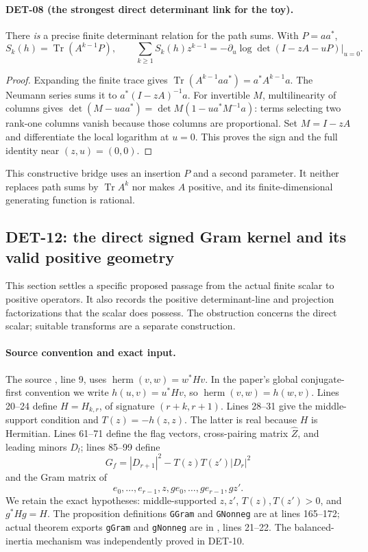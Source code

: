 \documentclass[11pt,a4paper]{article}
\newcommand{\Tr}{\operatorname{Tr}}
\newcommand{\fid}[1]{\textsf{#1}}
\begin{document}
\paragraph{DET-08 (the strongest direct determinant link for the toy).}
There \emph{is} a precise finite determinant relation for the path sums. With $P=aa^*$,
\[
 S_k(h)=\Tr(A^{k-1}P),\qquad
 \sum_{k\ge1}S_k(h)z^{k-1}
 =-\left.\partial_u\log\det(I-zA-uP)\right|_{u=0}.
\]
\begin{proof}
Expanding the finite trace gives $\Tr(A^{k-1}aa^*)=a^*A^{k-1}a$. The Neumann series sums it to $a^*(I-zA)^{-1}a$. For invertible $M$, multilinearity of columns gives
$\det(M-uaa^*)=\det M(1-u a^*M^{-1}a)$: terms selecting two rank-one columns vanish because those columns are proportional. Set $M=I-zA$ and differentiate the local logarithm at $u=0$. This proves the sign and the full identity near $(z,u)=(0,0)$.
\end{proof}
This constructive bridge uses an insertion $P$ and a second parameter. It neither replaces path sums by $\Tr A^k$ nor makes $A$ positive, and its finite-dimensional generating function is rational.

\subsection{DET-12: the direct signed Gram kernel and its valid positive geometry}
This section settles a specific proposed passage from the actual finite scalar to
positive operators. It also records the positive determinant-line and projection
factorizations that the scalar does possess. The obstruction concerns the direct
scalar; suitable transforms are a separate construction.

\paragraph{Source convention and exact input.}
The source , line 9, uses
\(\operatorname{herm}(v,w)=w^*Hv\). In the paper's global conjugate-first convention
we write \(h(u,v)=u^*Hv\), so \(\operatorname{herm}(v,w)=h(w,v)\).
Lines 20--24 define \(H=H_{k,r}\), of signature \((r+k,r+1)\).
Lines 28--31 give the middle-support condition and \(T(z)=-h(z,z)\).
The latter is real because \(H\) is Hermitian. Lines 61--71 define the flag
vectors, cross-pairing matrix \(\widehat Z\), and leading minors \(D_l\);
lines 85--99 define
\[
 G_f=|D_{r+1}|^2-T(z)T(z')|D_r|^2
\]
and the Gram matrix of
\[
 e_0,\ldots,e_{r-1},z,ge_0,\ldots,ge_{r-1},gz'.
\]
We retain the exact hypotheses: middle-supported \(z,z'\), \(T(z),T(z')>0\),
and \(g^*Hg=H\). The proposition definitions \texttt{GGram} and
\texttt{GNonneg} are at lines 165--172; actual theorem exports
\texttt{gGram} and \texttt{gNonneg} are in
, lines 21--22.
The balanced-inertia mechanism was independently proved in \fid{DET-10}.
\end{document}

